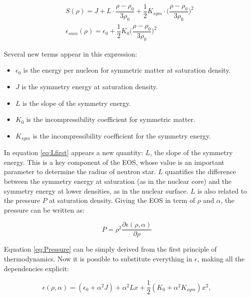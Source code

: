 \begin{equation} \label{eq:Lfirst}
\begin{split}
& S(\rho) = J + L \cdot \dfrac{\rho - \rho_{0}}{3 \rho_{0}} + \dfrac{1}{2} K_{sym} \cdot \biggl(\dfrac{\rho - \rho_{0}}{3 \rho_{0}}\biggl)^{2} \\
& \epsilon _{smn} (\rho) = \epsilon_{0} + \dfrac{1}{2}K_{0} \biggl(\dfrac{\rho - \rho_{0}}{3 \rho_{0}} \biggl)^{2} 
\end{split}
\end{equation}

Several new terms appear in this expression:
\begin{itemize}
\item $\epsilon_{0}$ is the energy per nucleon for symmetric matter at saturation density.
\item $J$ is the symmetry energy at saturation density.
\item $L$ is the slope of the symmetry energy.
\item $K_{0}$ is the incompressibility coefficient for symmetric matter. 
\item $K_{sym}$ is the incompressibility coefficient for the symmetry energy.
\end{itemize}

In equation \ref{eq:Lfirst} appears a new quantity: $L$, the slope of the symmetry energy. This is a key component of the EOS, whose value is an important parameter to determine the radius of neutron star. $L$ quantifies the difference between the symmetry energy at saturation (as in the nuclear core) and the symmetry energy at lower densities, as in the nuclear surface. $L$ is also related to the pressure $P$ at saturation density. Giving the EOS in term of $\rho$ and $\alpha$, the pressure can be written as:

\begin{equation} \label{eq:Pressure}
P = \rho^{2} \dfrac{\partial \epsilon(\rho, \alpha)}{\partial \rho}
\end{equation} 

Equation \ref{eq:Pressure} can be simply derived from the first principle of thermodynamics. Now it is possible to substitute everything in $\epsilon$, making all the dependencies explicit:

\begin{equation}
\epsilon (\rho, \alpha) = (\epsilon_{0} + \alpha^{2} J) + \alpha^{2}Lx + \frac{1}{2} (K_{0} + \alpha^{2}K_{sym})x^{2} ,
\end{equation}

